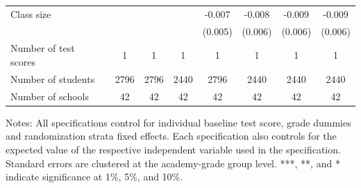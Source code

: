 \begin{center}
\begin{scriptsize}
\begin{threeparttable}
\begin{tabular} {@{} l l c c c c c c c  @{}}
Class size &  &  &  &  & -0.007 & -0.008 & -0.009 & -0.009 \\
                 &  &  &  &  & (0.005) & (0.006) & (0.006) & (0.006) \\
\midrule
Number of test scores &  & 1 & 1 & 1 & 1 & 1 & 1 & 1 \\
Number of students &  & 2796 & 2796 & 2440 & 2796 & 2440 & 2440 & 2440 \\
Number of schools &  & 42 & 42 & 42 & 42 & 42 & 42 & 42 \\
\bottomrule
\end{tabular}
\begin{tablenotes}
\item Notes: All specifications control for individual baseline test score, grade dummies and randomization strata fixed effects. Each specification also controls for the expected value of the respective independent variable used in the specification. Standard errors are clustered at the academy-grade group level. ***, **, and * indicate significance at 1\%, 5\%, and 10\%.\end{tablenotes}
\end{threeparttable}
\end{scriptsize}
\end{center}
\clearpage
